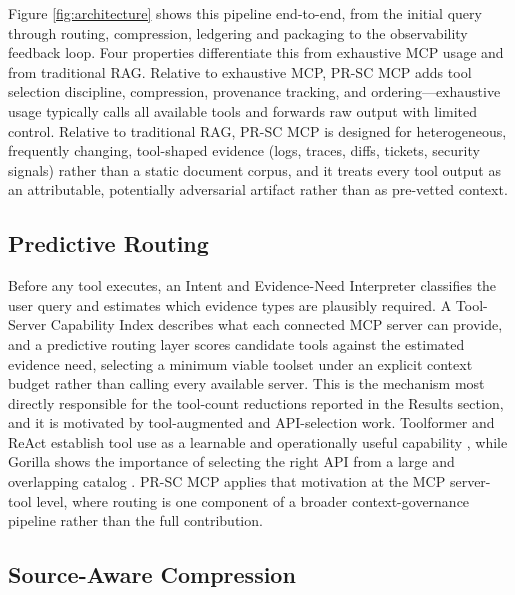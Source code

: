 Figure \ref{fig:architecture} shows this pipeline end-to-end, from the initial query through routing, compression, ledgering and packaging to the observability feedback loop. Four properties differentiate this from exhaustive MCP usage and from traditional RAG. Relative to exhaustive MCP, PR-SC MCP adds tool selection discipline, compression, provenance tracking, and ordering---exhaustive usage typically calls all available tools and forwards raw output with limited control. Relative to traditional RAG, PR-SC MCP is designed for heterogeneous, frequently changing, tool-shaped evidence (logs, traces, diffs, tickets, security signals) rather than a static document corpus, and it treats every tool output as an attributable, potentially adversarial artifact rather than as pre-vetted context.

\subsection{Predictive Routing}

Before any tool executes, an Intent and Evidence-Need Interpreter classifies the user query and estimates which evidence types are plausibly required. A Tool-Server Capability Index describes what each connected MCP server can provide, and a predictive routing layer scores candidate tools against the estimated evidence need, selecting a minimum viable toolset under an explicit context budget rather than calling every available server. This is the mechanism most directly responsible for the tool-count reductions reported in the Results section, and it is motivated by tool-augmented and API-selection work. Toolformer and ReAct establish tool use as a learnable and operationally useful capability \cite{Schick2023, Yao2023}, while Gorilla shows the importance of selecting the right API from a large and overlapping catalog \cite{Patil2024}. PR-SC MCP applies that motivation at the MCP server-tool level, where routing is one component of a broader context-governance pipeline rather than the full contribution.

\subsection{Source-Aware Compression}

